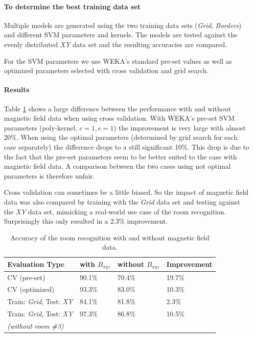 \paragraph{To determine the best training data set} Multiple models are generated using the two training data sets (\emph{Grid}, \emph{Borders}) and different SVM parameters and kernels. The models are tested against the evenly distributed \emph{XY} data set and the resulting accuracies are compared.

For the SVM parameters we use WEKA's standard pre-set values as well as optimized parameters selected with cross validation and grid search.

\paragraph{Results}

Table \ref{tab:RoomRecognitionMagneticField} shows a large difference between the performance with and without magnetic field data when using cross validation. With WEKA's pre-set SVM parameters (poly-kernel, $c=1,e=1$) the improvement is very large with almost 20\%. When using the optimal parameters (determined by grid search for each case separately) the difference drops to a still significant 10\%. This drop is due to the fact that the pre-set parameters seem to be better suited to the case with magnetic field data. A comparison between the two cases using not optimal parameters is therefore unfair.

Cross validation can sometimes be a little biased. So the impact of magnetic field data was also compared by training with the \emph{Grid} data set and testing against the \emph{XY} data set, mimicking a real-world use case of the room recognition. Surprisingly this only resulted in a 2.3\% improvement.



\begin{table}
\centering
\begin{tabular}{l l l l}
\toprule
\textbf{Evaluation Type}&\textbf{with }\boldmath$B_{xyz}$&\textbf{without }\boldmath$B_{xyz}$&\textbf{Improvement} \\
\midrule
CV (pre-set)&90.1\%&70.4\%&19.7\%\\
CV (optimized)&93.3\%&83.0\%&10.3\%\\
Train: \emph{Grid}, Test: \emph{XY}&84.1\%&81.8\%&2.3\%\\
Train: \emph{Grid}, Test: \emph{XY}&97.3\%&86.8\%&10.5\%\\
\textit{(without room \#3)}&&\\
\bottomrule
\end{tabular}
\caption[Room Recognition - Magnetic Field improvements]{Accuracy of the room recognition with and without magnetic field data.}
\label{tab:RoomRecognitionMagneticField}
\end{table}

